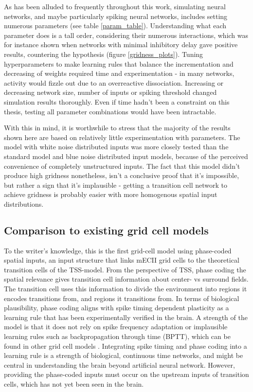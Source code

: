 \documentclass{article}
\begin{document}
    As has been alluded to frequently throughout this work, simulating neural networks, and maybe particularly spiking neural networks, includes setting numerous parameters (see table \ref{param_table}). Understanding what each parameter does is a tall order, considering their numerous interactions, which was for instance shown when networks with minimal inhibitory delay gave positive results, countering the hypothesis (figure \ref{gridness_plots}). Tuning hyperparameters to make learning rules that balance the incrementation and decreasing of weights required time and experimentation - in many networks, activity would fizzle out due to an overreactive dissociation. Increasing or decreasing network size, number of inputs or spiking threshold changed simulation results thoroughly. Even if time hadn't been a constraint on this thesis, testing all parameter combinations would have been intractable.

    With this in mind, it is worthwhile to stress that the majority of the results shown here are based on relatively little experimentation with parameters. The model with white noise distributed inputs was more closely tested than the standard model and blue noise distributed input models, because of the perceived convenience of completely unstructured inputs. The fact that this model didn't produce high gridness nonetheless, isn't a conclusive proof that it's impossible, but rather a sign that it's implausible - getting a transition cell network to achieve gridness is probably easier with more homogenous spatial input distributions. 

    \subsection{Comparison to existing grid cell models} \label{Other model comparisons}

    To the writer's knowledge, this is the first grid-cell model using phase-coded spatial inputs, an input structure that links mECII grid cells to the theoretical transition cells of the TSS-model. From the perspective of TSS, phase coding the spatial relevance gives transition cell information about center- vs surround fields. The transition cell uses this information to divide the environment into regions it encodes transitions from, and regions it transitions from. In terms of biological plausibility, phase coding aligns with spike timing dependent plasticity as a learning rule that has been experimentally verified in the brain. A strength of the model is that it does not rely on spike frequency adaptation or implausible learning rules such as backpropagation through time (BPTT), which can be found in other grid cell models \parencite{Kropff2008,Sorscher2023}. Integrating spike timing and phase coding into a learning rule is a strength of biological, continuous time networks, and might be central in understanding the brain beyond artificial neural network. However, providing the phase-coded inputs must occur on the upstream inputs of transition cells, which has not yet been seen in the brain.
\end{document}
